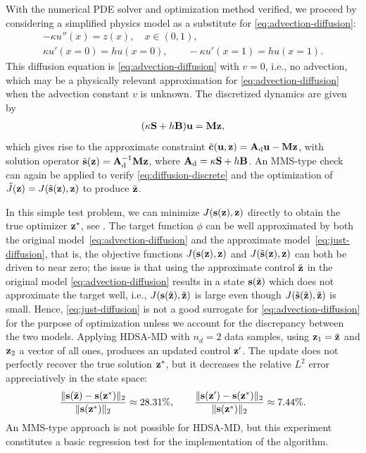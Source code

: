 With the numerical PDE solver and optimization method verified, we proceed by considering a simplified physics model as a substitute for \cref{eq:advection-diffusion}:
\begin{subequations}\label{eq:just-diffusion}
\begin{gather}
\label{eq:just-diffusion-dynamics}
-\kappa u''(x) = z(x),
\quad x\in(0, 1),
\\
\label{eq:just-diffusion-boundaries}
\kappa u'(x=0) = h u(x=0),
\qquad
-\kappa u'(x=1) = h u(x=1).
\end{gather}
\end{subequations}
This diffusion equation is \cref{eq:advection-diffusion} with $v = 0$, i.e., no advection, which may be a physically relevant approximation for \cref{eq:advection-diffusion} when the advection constant $v$ is unknown.
The discretized dynamics are given by
\begin{align}
    \label{eq:diffusion-discrete}
    (\kappa\mathbf{S} + h\mathbf{B})\mathbf{u} = \mathbf{M}\mathbf{z},
\end{align}
which gives rise to the approximate constraint $\tilde{\mathbf{c}}(\mathbf{u},\mathbf{z}) = \mathbf{A}_\textrm{d}\mathbf{u} - \mathbf{M}\mathbf{z}$, with solution operator $\tilde{\mathbf{s}}(\mathbf{z}) = \mathbf{A}_\textrm{d}^{-1}\mathbf{M}\mathbf{z}$, where $\mathbf{A}_\text{d} = \kappa\mathbf{S} + h\mathbf{B}$.
An MMS-type check can again be applied to verify \cref{eq:diffusion-discrete} and the optimization of $\tilde{J}(\mathbf{z}) = J(\tilde{\mathbf{s}}(\mathbf{z}),\mathbf{z})$ to produce $\tilde{\mathbf{z}}$.

In this simple test problem, we can minimize $J(\mathbf{s}(\mathbf{z}),\mathbf{z})$ directly to obtain the true optimizer $\mathbf{z}^{*}$, see .
The target function $\phi$ can be well approximated by both the original model~\cref{eq:advection-diffusion} and the approximate model~\cref{eq:just-diffusion}, that is, the objective functions $J(\mathbf{s}(\mathbf{z}),\mathbf{z})$ and $J(\tilde{\mathbf{s}}(\mathbf{z}),\mathbf{z})$ can both be driven to near zero; the issue is that using the approximate control $\tilde{\mathbf{z}}$ in the original model \cref{eq:advection-diffusion} results in a state $\mathbf{s}(\tilde{\mathbf{z}})$ which does not approximate the target well, i.e., $J(\mathbf{s}(\tilde{\mathbf{z}}), \tilde{\mathbf{z}})$ is large even though $J(\tilde{\mathbf{s}}(\tilde{\mathbf{z}}), \tilde{\mathbf{z}})$ is small.
Hence, \cref{eq:just-diffusion} is not a good surrogate for \cref{eq:advection-diffusion} for the purpose of optimization unless we account for the discrepancy between the two models.
Applying HDSA-MD with $n_d = 2$ data samples, using $\mathbf{z}_1 = \tilde{\mathbf{z}}$ and $\mathbf{z}_2$ a vector of all ones, produces an updated control $\mathbf{z}'$.
The update does not perfectly recover the true solution $\mathbf{z}^*$, but it decreases the relative $L^2$ error appreciatively in the state space:
\begin{align}
    \frac{\|\mathbf{s}(\tilde{\mathbf{z}}) - \mathbf{s}(\mathbf{z}^{*})\|_{2}}{\|\mathbf{s}(\mathbf{z}^{*})\|_{2}}
    \approx 28.31\%,
    \qquad
    \frac{\|\mathbf{s}(\mathbf{z}') - \mathbf{s}(\mathbf{z}^{*})\|_{2}}{\|\mathbf{s}(\mathbf{z}^{*})\|_{2}}
    \approx 7.44\%.
\end{align}
An MMS-type approach is not possible for HDSA-MD, but this experiment constitutes a basic regression test for the implementation of the algorithm.

